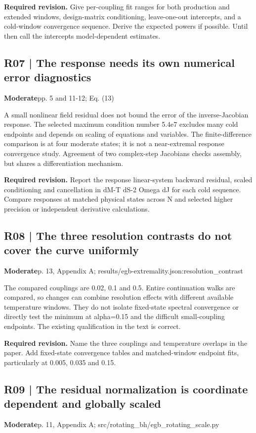 \documentclass[10pt,a4paper]{article}
\begin{document}
\textbf{Required revision.} Give per-coupling fit ranges for both production and extended windows, design-matrix conditioning, leave-one-out intercepts, and a cold-window convergence sequence. Derive the expected powers if possible. Until then call the intercepts model-dependent estimates.

\subsection*{R07 | The response needs its own numerical error diagnostics}
\textbf{Moderate}\quad pp. 5 and 11-12; Eq. (13)

A small nonlinear field residual does not bound the error of the inverse-Jacobian response. The selected maximum condition number 5.4e7 excludes many cold endpoints and depends on scaling of equations and variables. The finite-difference comparison is at four moderate states; it is not a near-extremal response convergence study. Agreement of two complex-step Jacobians checks assembly, but shares a differentiation mechanism.

\textbf{Required revision.} Report the response linear-system backward residual, scaled conditioning and cancellation in dM-T dS-2 Omega dJ for each cold sequence. Compare responses at matched physical states across N and selected higher precision or independent derivative calculations.

\subsection*{R08 | The three resolution contrasts do not cover the curve uniformly}
\textbf{Moderate}\quad p. 13, Appendix A; results/egb-extremality.json:resolution\_contrast

The compared couplings are 0.02, 0.1 and 0.5. Entire continuation walks are compared, so changes can combine resolution effects with different available temperature windows. They do not isolate fixed-state spectral convergence or directly test the minimum at alpha=0.15 and the difficult small-coupling endpoints. The existing qualification in the text is correct.

\textbf{Required revision.} Name the three couplings and temperature overlaps in the paper. Add fixed-state convergence tables and matched-window endpoint fits, particularly at 0.005, 0.035 and 0.15.

\subsection*{R09 | The residual normalization is coordinate dependent and globally scaled}
\textbf{Moderate}\quad p. 11, Appendix A; src/rotating\_bh/egb\_rotating\_scale.py
\end{document}
